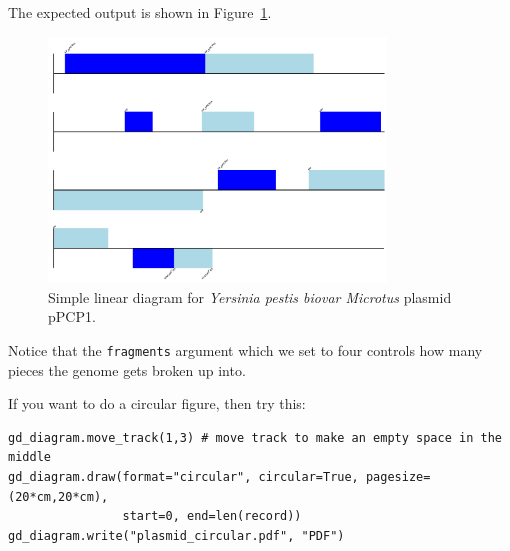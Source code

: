 \documentclass{report}
\begin{document}
\begin{htmlonly}

\end{htmlonly}
\begin{latexonly}
The expected output is shown in Figure~\ref{fig:plasmid_linear}.
\begin{figure}[htbp]
\centering
\includegraphics[width=0.8\textwidth]{images/plasmid_linear.png}
\caption{Simple linear diagram for \textit{Yersinia pestis biovar Microtus} plasmid pPCP1.}
\label{fig:plasmid_linear}
\end{figure}
\end{latexonly}
Notice that the \verb|fragments| argument which we set to four controls how
many pieces the genome gets broken up into.

If you want to do a circular figure, then try this:

\begin{verbatim}
gd_diagram.move_track(1,3) # move track to make an empty space in the middle
gd_diagram.draw(format="circular", circular=True, pagesize=(20*cm,20*cm),
                start=0, end=len(record))
gd_diagram.write("plasmid_circular.pdf", "PDF")
\end{verbatim}
\end{document}
